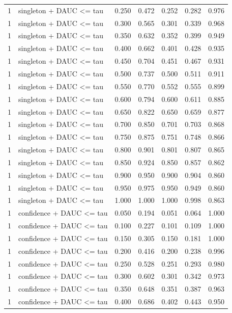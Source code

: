 \begin{tabular}{rlrrrrr}
1 & singleton + DAUC <= tau & 0.250 & 0.472 & 0.252 & 0.282 & 0.976 \\
1 & singleton + DAUC <= tau & 0.300 & 0.565 & 0.301 & 0.339 & 0.968 \\
1 & singleton + DAUC <= tau & 0.350 & 0.632 & 0.352 & 0.399 & 0.949 \\
1 & singleton + DAUC <= tau & 0.400 & 0.662 & 0.401 & 0.428 & 0.935 \\
1 & singleton + DAUC <= tau & 0.450 & 0.704 & 0.451 & 0.467 & 0.931 \\
1 & singleton + DAUC <= tau & 0.500 & 0.737 & 0.500 & 0.511 & 0.911 \\
1 & singleton + DAUC <= tau & 0.550 & 0.770 & 0.552 & 0.555 & 0.899 \\
1 & singleton + DAUC <= tau & 0.600 & 0.794 & 0.600 & 0.611 & 0.885 \\
1 & singleton + DAUC <= tau & 0.650 & 0.822 & 0.650 & 0.659 & 0.877 \\
1 & singleton + DAUC <= tau & 0.700 & 0.850 & 0.701 & 0.703 & 0.868 \\
1 & singleton + DAUC <= tau & 0.750 & 0.875 & 0.751 & 0.748 & 0.866 \\
1 & singleton + DAUC <= tau & 0.800 & 0.901 & 0.801 & 0.807 & 0.865 \\
1 & singleton + DAUC <= tau & 0.850 & 0.924 & 0.850 & 0.857 & 0.862 \\
1 & singleton + DAUC <= tau & 0.900 & 0.950 & 0.900 & 0.904 & 0.860 \\
1 & singleton + DAUC <= tau & 0.950 & 0.975 & 0.950 & 0.949 & 0.860 \\
1 & singleton + DAUC <= tau & 1.000 & 1.000 & 1.000 & 0.998 & 0.863 \\
1 & confidence + DAUC <= tau & 0.050 & 0.194 & 0.051 & 0.064 & 1.000 \\
1 & confidence + DAUC <= tau & 0.100 & 0.227 & 0.101 & 0.109 & 1.000 \\
1 & confidence + DAUC <= tau & 0.150 & 0.305 & 0.150 & 0.181 & 1.000 \\
1 & confidence + DAUC <= tau & 0.200 & 0.416 & 0.200 & 0.238 & 0.996 \\
1 & confidence + DAUC <= tau & 0.250 & 0.528 & 0.251 & 0.293 & 0.980 \\
1 & confidence + DAUC <= tau & 0.300 & 0.602 & 0.301 & 0.342 & 0.973 \\
1 & confidence + DAUC <= tau & 0.350 & 0.648 & 0.351 & 0.387 & 0.963 \\
1 & confidence + DAUC <= tau & 0.400 & 0.686 & 0.402 & 0.443 & 0.950 \\

\end{tabular}
